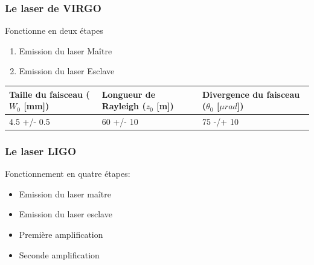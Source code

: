 \documentclass{beamer}
\begin{document}
\begin{frame}
	\frametitle{Le laser de VIRGO}
	Fonctionne en deux étapes
	\begin{enumerate}[1.]
		\item Emission du laser Maître
		\item Emission du laser Esclave 
	\end{enumerate}
	\begin{table}
	\small
	\centering
	\begin{tabular}{|l|l|l|}
	\hline
		\thead{Taille du faisceau \\ ($W_0$ [mm])}& \thead{Longueur de Rayleigh \\ ($z_0$ [m])} & \thead{Divergence du \\ faisceau ($\theta_0$ [$\mu rad$])} \\
		\hline
		4.5 +/- 0.5 & 60 +/- 10 & 75 -/+ 10 \\
		\hline
	\end{tabular}
	\end{table}

\end{frame}

\begin{frame}
\frametitle{Le laser LIGO}
Fonctionnement en quatre étapes:
\begin{itemize}
	\item Emission du laser maître
	\item Emission du laser esclave
	\item Première amplification
	\item Seconde amplification
\end{itemize}
\end{frame}
\end{document}
